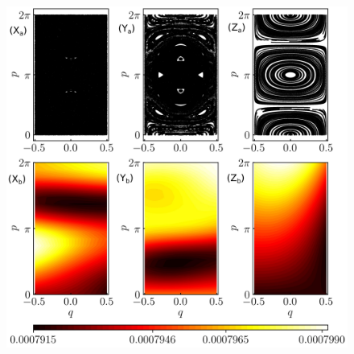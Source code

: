 \documentclass[%
reprint,
superscriptaddress,
amsmath,amssymb,
aps,
prb,
showkeys,
]{revtex4-2}
\providecommand{\DIFaddbeginFL}{} %
\providecommand{\DIFaddendFL}{} %
\providecommand{\DIFdelbeginFL}{} %
\providecommand{\DIFdelendFL}{} %
\newcommand{\DIFscaledelfig}{0.5}
\newlength{\DIFdelgraphicswidth} %
\newlength{\DIFdelgraphicsheight} %
\newcommand{\DIFaddincludegraphics}[2][]{{\color{blue}\fbox{\DIFOincludegraphics[#1]{#2}}}} %
\newcommand{\DIFdelincludegraphics}[2][]{%
\sbox{\DIFdelgraphicsbox}{\DIFOincludegraphics[#1]{#2}}%
\settoboxwidth{\DIFdelgraphicswidth}{\DIFdelgraphicsbox} %
\settoboxtotalheight{\DIFdelgraphicsheight}{\DIFdelgraphicsbox} %
\scalebox{\DIFscaledelfig}{%
\parbox[b]{\DIFdelgraphicswidth}{\usebox{\DIFdelgraphicsbox}\\[-\baselineskip] \rule{\DIFdelgraphicswidth}{0em}}\llap{\resizebox{\DIFdelgraphicswidth}{\DIFdelgraphicsheight}{%
\setlength{\unitlength}{\DIFdelgraphicswidth}%
\begin{picture}(1,1)%
\thicklines\linethickness{2pt} %
{\color[rgb]{1,0,0}\put(0,0){\framebox(1,1){}}}%
{\color[rgb]{1,0,0}\put(0,0){\line( 1,1){1}}}%
{\color[rgb]{1,0,0}\put(0,1){\line(1,-1){1}}}%
\end{picture}%
}\hspace*{3pt}}} %
} %
\DeclareRobustCommand{\DIFaddbeginFL}{\DIFOaddbeginFL \let\includegraphics\DIFaddincludegraphics} %
\DeclareRobustCommand{\DIFaddendFL}{\DIFOaddendFL \let\includegraphics\DIFOincludegraphics} %
\DeclareRobustCommand{\DIFdelbeginFL}{\DIFOdelbeginFL \let\includegraphics\DIFdelincludegraphics} %
\DeclareRobustCommand{\DIFdelendFL}{\DIFOaddendFL \let\includegraphics\DIFOincludegraphics} %
\begin{document}
\DIFdelendFL \DIFaddbeginFL \begin{figure}[t!]
	\DIFaddendFL \centering
	\DIFdelbeginFL %
\DIFdelendFL \DIFaddbeginFL \includegraphics[width = 9.0 cm]{figure_8.jpeg}

\end{figure}
\end{document}
